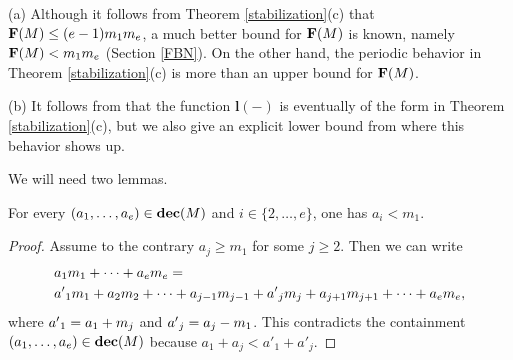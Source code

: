 \begin{remark}
(a) Although it follows from Theorem \ref{stabilization}(c) that $\mathbf{F}(M)\le(e-1)m_1m_e$, a much better bound for $\mathbf{F}(M)$ is known, namely $\mathbf{F}(M)<m_1m_e$ (Section \ref{FBN}). On the other hand, the periodic behavior in Theorem \ref{stabilization}(c) is more than an upper bound for $\mathbf{F}(M)$. 

\medskip\noindent(b) It follows from \cite{maximal_length} that the function $\textbf{l}(-)$ is eventually of the form in Theorem \ref{stabilization}(c), but we also  give an explicit lower bound from where this behavior shows up.
\end{remark}

We will need two lemmas.

\begin{lemma}\label{bounded}
For every $(a_1,\ldots,a_e)\in\textbf{dec}(M)$ and $i\in\{2,\ldots,e\}$, one has $a_i<m_1$.
\end{lemma}

\begin{proof}
Assume to the contrary $a_j\ge m_1$ for some $j\ge2$. Then we can write
\begin{align*}
&a_1m_1+\cdots+a_em_e=\\
&a\rq{}_1m_1+a_2m_2+\cdots+a_{j-1}m_{j-1}+a\rq{}_jm_j+a_{j+1}m_{j+1}+\cdots+a_em_e,
\end{align*}
where $a\rq{}_1=a_1+m_j$ and $a\rq{}_j=a_j-m_1$. This contradicts the containment $(a_1,\ldots,a_e)\in\textbf{dec}(M)$ because $a_1+a_j<a'_1+a'_j$.
\end{proof}

